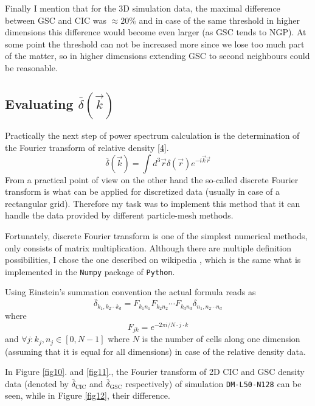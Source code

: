 \documentclass[12pt]{article}
\newcommand{\dmls}{\texttt{DM-L50-N128} }
\begin{document}
Finally I mention that for the 3D simulation data, the maximal difference between GSC and CIC was $\approx20\%$ and in case of the same threshold in higher dimensions this difference would become even larger (as GSC tends to NGP). At some point the threshold can not be increased more since we lose too much part of the matter, so in higher dimensions extending GSC to second neighbours could be reasonable.

\subsection{Evaluating $\overline{\delta}(\vec{k})$}
Practically the next step of power spectrum calculation is the determination of the Fourier transform of relative density \eqref{4}. 
\begin{equation}\label{4}
    \overline{\delta}(\vec{k})=\int d^3\vec{r}\delta(\vec{r})e^{-i\vec{k}\vec{r}}
\end{equation}
From a practical point of view on the other hand the so-called discrete Fourier transform is what can be applied for discretized data (usually in case of a rectangular grid). Therefore my task was to implement this method that it can handle the data provided by different particle-mesh methods.

Fortunately, discrete Fourier transform is one of the simplest numerical methods, only consists of matrix multiplication. Although there are multiple definition possibilities, I chose the one described on wikipedia \cite{WikipediaMultidimensionalDFT}, which is the same what is implemented in the \texttt{Numpy} package of \texttt{Python}.
\newline

Using Einstein's summation convention the actual formula reads as
\begin{equation}
    \overline{\delta}_{k_1,k_2\cdots k_d}=F_{k_1n_1}F_{k_2n_2}\cdots F_{k_dn_d}\delta_{n_1,n_2\cdots n_d}
\end{equation}
where
\begin{equation}
    F_{jk}=e^{-2\pi i/N\cdot j\cdot k}
\end{equation}
and $\forall j :k_j,n_j\in[0,N-1]$ where $N$ is the number of cells along one dimension (assuming that it is equal for all dimensions) in case of the relative density data.

In Figure \ref{fig10}. and \ref{fig11}., the Fourier transform of 2D CIC and GSC density data (denoted by $\overline{\delta}_{\text{CIC}}$ and $\overline{\delta}_{\text{GSC}}$ respectively) of simulation \dmls can be seen, while in Figure \ref{fig12}, their difference.
\end{document}
